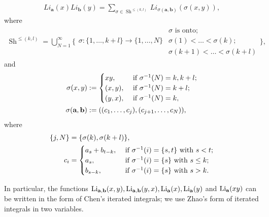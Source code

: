 \documentclass[a4paper,fleqn]{cas-sc}
\DeclareMathOperator{\Sh}{Sh}
\begin{document}
\begin{align*}
    Li_\textbf{a}(x)Li_\textbf{b}(y)=\sum_{\sigma \in \Sh^{\leq(k,l)}}Li_{\sigma(\textbf{a},\textbf{b})}(\sigma(x,y)),
\end{align*}
where 
\begin{align*}
\Sh^{\leq(k,l)} = \bigcup_{N=1}^{\infty} \Biggl\{ 
       \begin{array}{l|cl}
                      & \sigma \text{ is onto;}\\
             \sigma : \{1, \ldots, k+l\} \to \{1, \ldots, N\} & \sigma(1) < \ldots < \sigma(k);\\
             & \sigma(k+1) < \ldots < \sigma(k+l)
        \end{array}
     \Biggr\},
\end{align*}
%
and
\begin{equation*}
\begin{split}
    \sigma(x,y) & := \begin{cases}
        xy, \hfill & \text{ if } \sigma^{-1}(N)=k, k+l; \\
        (x,y), \hfill & \text{ if } \sigma^{-1}(N)=k+l; \\
        (y,x), \hfill & \text{ if } \sigma^{-1}(N)=k,
    \end{cases}\\
    \sigma(\textbf{a}, \textbf{b}) & :=((c_1,\ldots, c_j),(c_{j+1}, \ldots, c_N)), 
\end{split}
\end{equation*}
%
where
    \begin{align*}
        \{j,N\} & =\{\sigma(k), \sigma(k+l)\},\\
        c_i & = \begin{cases}
            a_s + b_{t-k}, \hfill & \text{ if } \sigma^{-1}(i) = \{s,t\} \text{ with } s < t;\\
            a_s, \hfill & \text{ if } \sigma^{-1}(i) = \{s\} \text{ with } s \leq k;\\
            b_{s-k}, \hfill & \text{ if } \sigma^{-1}(i) = \{s\} \text{ with } s > k.\\
        \end{cases}
    \end{align*}

In particular, the functions $\text{Li}_{\bf{a},\bf{b}}(x,y), \text{Li}_{\bf{a},\bf{b}}(y,x),\text{Li}_{\bf{a}}(x),\text{Li}_{\bf{a}}(y)$ and $\text{Li}_{\bf{a}}(xy)$ can be written in the form of Chen's iterated integrals; we use Zhao's form \cite{Zhao} of iterated integrals in two variables.
\end{document}
